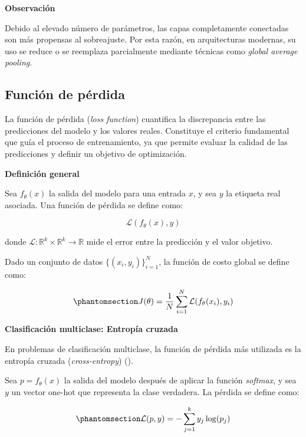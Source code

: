 \documentclass[
  spanish,
  us-letterpaper,
]{scrreprt}
\theoremstyle{definition}
\theoremstyle{remark}
\begin{document}
\textbf{Observación}

Debido al elevado número de parámetros, las capas completamente
conectadas son más propensas al sobreajuste. Por esta razón, en
arquitecturas modernas, su uso se reduce o se reemplaza parcialmente
mediante técnicas como \emph{global average pooling}.

\subsection{Función de pérdida}\label{funciuxf3n-de-puxe9rdida}

La función de pérdida (\emph{loss function}) cuantifica la discrepancia
entre las predicciones del modelo y los valores reales. Constituye el
criterio fundamental que guía el proceso de entrenamiento, ya que
permite evaluar la calidad de las predicciones y definir un objetivo de
optimización.

\textbf{Definición general}

Sea \(f_\theta(x)\) la salida del modelo para una entrada \(x\), y sea
\(y\) la etiqueta real asociada. Una función de pérdida se define como:

\[
\mathcal{L}(f_\theta(x), y)
\]

donde \(\mathcal{L} : \mathbb{R}^k \times \mathbb{R}^k \to \mathbb{R}\)
mide el error entre la predicción y el valor objetivo.

Dado un conjunto de datos \(\{(x_i, y_i)\}_{i=1}^{N}\), la función de
costo global se define como:

\begin{equation}\phantomsection\label{eq-risk}{
J(\theta) = \frac{1}{N} \sum_{i=1}^{N} \mathcal{L}(f_\theta(x_i), y_i)
}\end{equation}

\textbf{Clasificación multiclase: Entropía cruzada}

En problemas de clasificación multiclase, la función de pérdida más
utilizada es la entropía cruzada (\emph{cross-entropy})
().

Sea \(p = f_\theta(x)\) la salida del modelo después de aplicar la
función \emph{softmax}, y sea \(y\) un vector one-hot que representa la
clase verdadera. La pérdida se define como:

\begin{equation}\phantomsection\label{eq-cross-entropy}{
\mathcal{L}(p, y) = - \sum_{j=1}^{k} y_j \log(p_j)
}\end{equation}
\end{document}
